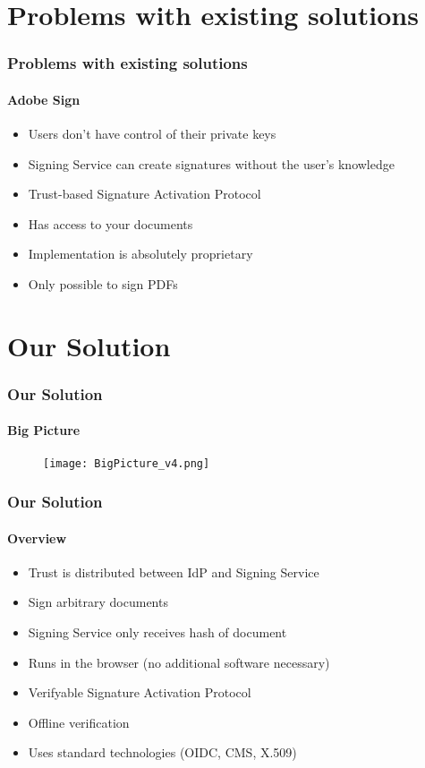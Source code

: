 \section{Problems with existing solutions}
\sectionpage


\begin{frame}[t]\frametitle{Problems with existing solutions}
	\framesubtitle{Adobe Sign}
	\begin{itemize}
	  \item Users don't have control of their private keys
      \item Signing Service can create signatures without the user's knowledge
      \item Trust-based Signature Activation Protocol
      \item Has access to your documents
	  \item Implementation is absolutely proprietary
	  \item Only possible to sign PDFs
	\end{itemize}
\end{frame}


\section{Our Solution}
\sectionpage

\begin{frame}[t]\frametitle{Our Solution}
	\framesubtitle{Big Picture}
	\begin{figure}[ht]
		\centering
		\texttt{[image: BigPicture\_v4.png]}
	\end{figure}
\end{frame}

\begin{frame}[t]\frametitle{Our Solution}
	\framesubtitle{Overview}
	\begin{itemize}
		\item Trust is distributed between IdP and Signing Service
		\item Sign arbitrary documents
		\item Signing Service only receives hash of document
		\item Runs in the browser (no additional software necessary)
		\item Verifyable Signature Activation Protocol
		\item Offline verification
		\item Uses standard technologies (OIDC, CMS, X.509)
	\end{itemize}
\end{frame}

